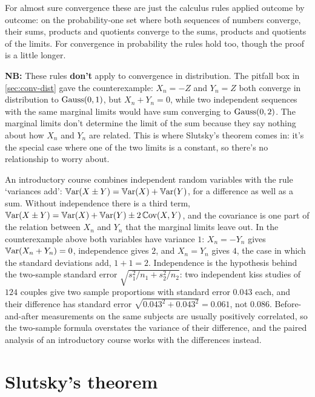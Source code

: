 For almost sure convergence these are just the calculus rules applied outcome by outcome: on the probability-one set where both sequences of numbers converge, their sums, products and quotients converge to the sums, products and quotients of the limits.
For convergence in probability the rules hold too, though the proof is a little longer.

\textbf{NB:} These rules \textbf{don't} apply to convergence in distribution.
The pitfall box in \cref{sec:conv-dist} gave the counterexample: $X_n = -Z$ and $Y_n = Z$ both converge in distribution to $\text{Gauss}(0,1)$, but $X_n + Y_n = 0$, while two independent sequences with the same marginal limits would have sum converging to $\text{Gauss}(0,2)$.
The marginal limits don't determine the limit of the sum because they say nothing about how $X_n$ and $Y_n$ are related.
This is where Slutsky's theorem comes in: it's the special case where one of the two limits is a constant, so there's no relationship to worry about.

\begin{bridge}
An introductory course combines independent random variables with the rule `variances add': $\operatorname*{\mathbb{V}\text{ar}}(X \pm Y) = \operatorname*{\mathbb{V}\text{ar}}(X) + \operatorname*{\mathbb{V}\text{ar}}(Y)$, for a difference as well as a sum.
Without independence there is a third term, $\operatorname*{\mathbb{V}\text{ar}}(X \pm Y) = \operatorname*{\mathbb{V}\text{ar}}(X) + \operatorname*{\mathbb{V}\text{ar}}(Y) \pm 2\operatorname*{\mathbb{C}\text{ov}}(X, Y)$, and the covariance is one part of the relation between $X_n$ and $Y_n$ that the marginal limits leave out.
In the counterexample above both variables have variance $1$: $X_n = -Y_n$ gives $\operatorname*{\mathbb{V}\text{ar}}(X_n + Y_n) = 0$, independence gives $2$, and $X_n = Y_n$ gives $4$, the case in which the standard deviations add, $1 + 1 = 2$.
Independence is the hypothesis behind the two-sample standard error $\sqrt{s_1^2/n_1 + s_2^2/n_2}$: two independent kiss studies of $124$ couples give two sample proportions with standard error $0.043$ each, and their difference has standard error $\sqrt{0.043^2 + 0.043^2} = 0.061$, not $0.086$.
Before-and-after measurements on the same subjects are usually positively correlated, so the two-sample formula overstates the variance of their difference, and the paired analysis of an introductory course works with the differences instead.
\end{bridge}

\section{Slutsky's theorem}
\label{sec:slutsky}

